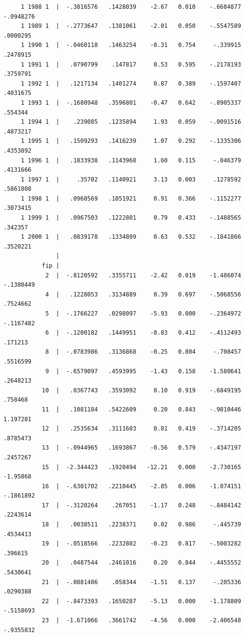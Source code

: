\documentclass[
]{book}
\begin{document}
\begin{verbatim}
     1 1988 1  |  -.3816576   .1428039    -2.67   0.010    -.6684877   -.0948276
     1 1989 1  |  -.2773647   .1381061    -2.01   0.050    -.5547589    .0000295
     1 1990 1  |  -.0460118   .1463254    -0.31   0.754     -.339915    .2478915
     1 1991 1  |   .0790799    .147817     0.53   0.595    -.2178193    .3759791
     1 1992 1  |   .1217134   .1401274     0.87   0.389    -.1597407    .4031675
     1 1993 1  |  -.1680948   .3596801    -0.47   0.642    -.8905337     .554344
     1 1994 1  |    .239085   .1235894     1.93   0.059    -.0091516    .4873217
     1 1995 1  |   .1509293   .1416239     1.07   0.292    -.1335306    .4353892
     1 1996 1  |   .1833938   .1143968     1.60   0.115     -.046379    .4131666
     1 1997 1  |     .35702   .1140921     3.13   0.003     .1278592    .5861808
     1 1998 1  |   .0960569   .1051921     0.91   0.366    -.1152277    .3073415
     1 1999 1  |   .0967503   .1222801     0.79   0.433    -.1488565     .342357
     1 2000 1  |   .0839178   .1334809     0.63   0.532    -.1841866    .3520221
               |
           fip |
            2  |  -.8120592   .3355711    -2.42   0.019    -1.486074   -.1380449
            4  |   .1228053   .3134889     0.39   0.697    -.5068556    .7524662
            5  |  -.1766227   .0298097    -5.93   0.000    -.2364972   -.1167482
            6  |  -.1200182   .1449951    -0.83   0.412    -.4112493     .171213
            8  |  -.0783986   .3136868    -0.25   0.804     -.708457    .5516599
            9  |  -.6579097   .4593995    -1.43   0.158    -1.580641    .2648213
           10  |   .0367743   .3593092     0.10   0.919    -.6849195     .758468
           11  |   .1081184   .5422609     0.20   0.843    -.9810446    1.197281
           12  |   .2535634   .3111603     0.81   0.419    -.3714205    .8785473
           13  |  -.0944965   .1693867    -0.56   0.579    -.4347197    .2457267
           15  |  -2.344423   .1920494   -12.21   0.000    -2.730165    -1.95868
           16  |  -.6301702   .2210445    -2.85   0.006    -1.074151   -.1861892
           17  |  -.3120264    .267051    -1.17   0.248    -.8484142    .2243614
           18  |   .0038511   .2238371     0.02   0.986     -.445739    .4534413
           19  |  -.0518566   .2232802    -0.23   0.817    -.5003282     .396615
           20  |   .0487544   .2461016     0.20   0.844    -.4455552    .5430641
           21  |  -.0881486    .058344    -1.51   0.137     -.205336    .0290388
           22  |  -.8473393   .1650287    -5.13   0.000    -1.178809   -.5158693
           23  |  -1.671066   .3661742    -4.56   0.000    -2.406548   -.9355832

\end{verbatim}
\end{document}
